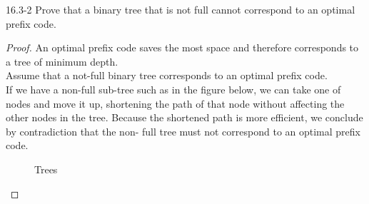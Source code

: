 \begin{problem}{16.3-2}
  Prove that a binary tree that is not full cannot correspond to an optimal prefix code.
  \begin{solution}
    \begin{proof}
      An optimal prefix code saves the most space and therefore corresponds to a tree of minimum depth. \\ Assume that a
      not-full binary tree corresponds to an optimal prefix code. \\ If we have a non-full sub-tree such as in the
      figure below, we can take one of nodes and move it up, shortening the path of that node without affecting the
      other nodes in the tree. Because the shortened path is more efficient, we conclude by contradiction that the non-
      full tree must not correspond to an optimal prefix code. \qedhere
      \begin{figure}[H]
        \centering
        \caption{Trees}

\end{figure}
\end{proof}
\end{solution}
\end{problem}
